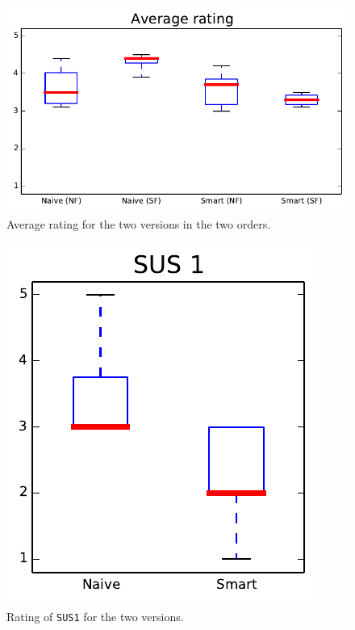 \begin{figure}
\center
\includegraphics[width=.9\textwidth]{img/graphs/4b_10.pdf}
\caption{Average rating for the two versions in the two orders.}
\end{figure}

\begin{figure}
\center
\includegraphics[width=.9\textwidth]{img/graphs/4a_00.pdf}
\caption{Rating of \texttt{SUS1} for the two versions.}
\end{figure}

